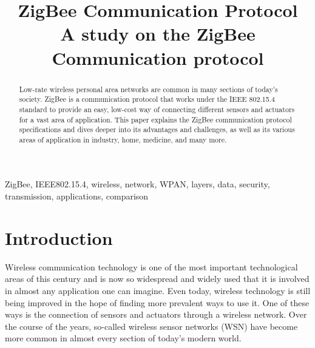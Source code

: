 \documentclass[conference]{IEEEtran}
\begin{document}
\title{ZigBee Communication Protocol\\
{\footnotesize A study on the ZigBee Communication protocol}
}

\author{
\and
{}
\and
{}
}


\maketitle

\begin{abstract}
Low-rate wireless personal area networks are common in many sections of today's society. ZigBee is a communication protocol that works under the IEEE 802.15.4 standard to provide an easy, low-cost way of connecting different sensors and actuators for a vast area of application. This paper explains the ZigBee communication protocol specifications and dives deeper into its advantages and challenges, as well as its various areas of application in industry, home, medicine, and many more.
\end{abstract}

\begin{IEEEkeywords}
ZigBee, IEEE802.15.4, wireless, network, WPAN, layers, data, security, transmission, applications, comparison
\end{IEEEkeywords}

\section{Introduction}
Wireless communication technology is one of the most important technological areas of this century and is now so widespread and widely used that it is involved in almost any application one can imagine. Even today, wireless technology is still being improved in the hope of finding more prevalent ways to use it. One of these ways is the connection of sensors and actuators through a wireless network. Over the course of the years, so-called wireless sensor networks (WSN) have become more common in almost every section of today's modern world.\\
\end{document}
